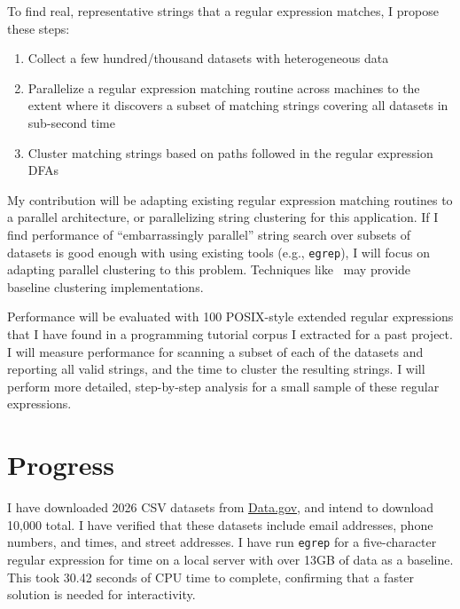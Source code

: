 \documentclass[10pt]{article}
\begin{document}
To find real, representative strings that a regular expression matches, I propose these steps:
\begin{enumerate}[noitemsep]
\item Collect a few hundred/thousand datasets with heterogeneous data
\item Parallelize a regular expression matching routine across machines to the extent where it discovers a subset of matching strings covering all datasets in sub-second time
\item Cluster matching strings based on paths followed in the regular expression DFAs
\end{enumerate}
My contribution will be adapting existing regular expression matching routines to a parallel architecture, or parallelizing string clustering for this application.
If I find performance of ``embarrassingly parallel'' string search over subsets of datasets is good enough with using existing tools (e.g., \texttt{egrep}), I will focus on adapting parallel clustering to this problem.
Techniques like~\cite{zhao_parallel_2009} may provide baseline clustering implementations.

Performance will be evaluated with 100 POSIX-style extended regular expressions that I have found in a programming tutorial corpus I extracted for a past project.
I will measure performance for scanning a subset of each of the datasets and reporting all valid strings, and the time to cluster the resulting strings.
I will perform more detailed, step-by-step analysis for a small sample of these regular expressions.

\section{Progress}

I have downloaded 2026 CSV datasets from \url{Data.gov}, and intend to download 10,000 total.
I have verified that these datasets include email addresses, phone numbers, and times, and street addresses.
I have run \texttt{egrep} for a five-character regular expression for time on a local server with over 13GB of data as a baseline.
This took 30.42 seconds of CPU time to complete, confirming that a faster solution is needed for interactivity.

\printbibliography{}
\end{document}
